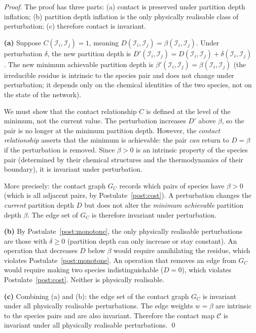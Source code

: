 \documentclass[11pt,twocolumn]{article}
\theoremstyle{plain}
\theoremstyle{definition}
\newcommand{\CC}{\mathcal{C}}
\begin{document}
\begin{proof}
The proof has three parts: (a) contact is preserved under partition depth
inflation; (b) partition depth inflation is the only physically realisable
class of perturbation; (c) therefore contact is invariant.

\textbf{(a)} Suppose $C(\mathcal{I}_i, \mathcal{I}_j) = 1$, meaning
$D(\mathcal{I}_i, \mathcal{I}_j) = \beta(\mathcal{I}_i, \mathcal{I}_j)$. Under
perturbation $\delta$, the new partition depth is $D'(\mathcal{I}_i,
\mathcal{I}_j) = D(\mathcal{I}_i, \mathcal{I}_j) + \delta(\mathcal{I}_i,
\mathcal{I}_j)$. The new minimum achievable partition depth is $\beta'
(\mathcal{I}_i, \mathcal{I}_j) = \beta(\mathcal{I}_i, \mathcal{I}_j)$
(the irreducible residue is intrinsic to the species pair and does not change
under perturbation; it depends only on the chemical identities of the two
species, not on the state of the network).

We must show that the contact relationship $C$ is defined at the level of the
minimum, not the current value. The perturbation increases $D'$ above $\beta$,
so the pair is no longer at the minimum partition depth. However, the
\emph{contact relationship} asserts that the minimum is achievable: the pair
\emph{can} return to $D = \beta$ if the perturbation is removed. Since
$\beta > 0$ is an intrinsic property of the species pair (determined by their
chemical structures and the thermodynamics of their boundary), it is invariant
under perturbation.

More precisely: the contact graph $G_C$ records which pairs of species have
$\beta > 0$ (which is all adjacent pairs, by Postulate~\ref{post:cost}). A
perturbation changes the \emph{current} partition depth $D$ but does not
alter the \emph{minimum achievable} partition depth $\beta$. The edge set of
$G_C$ is therefore invariant under perturbation.

\textbf{(b)} By Postulate~\ref{post:monotone}, the only physically realisable
perturbations are those with $\delta \geq 0$ (partition depth can only increase
or stay constant). An operation that decreases $D$ below $\beta$ would require
annihilating the residue, which violates Postulate~\ref{post:monotone}. An
operation that removes an edge from $G_C$ would require making two species
indistinguishable ($D = 0$), which violates Postulate~\ref{post:cost}. Neither
is physically realisable.

\textbf{(c)} Combining (a) and (b): the edge set of the contact graph $G_C$
is invariant under all physically realisable perturbations. The edge weights
$w = \beta$ are intrinsic to the species pairs and are also invariant. Therefore
the contact map $\CC$ is invariant under all physically realisable
perturbations. \qed
\end{proof}
\end{document}
